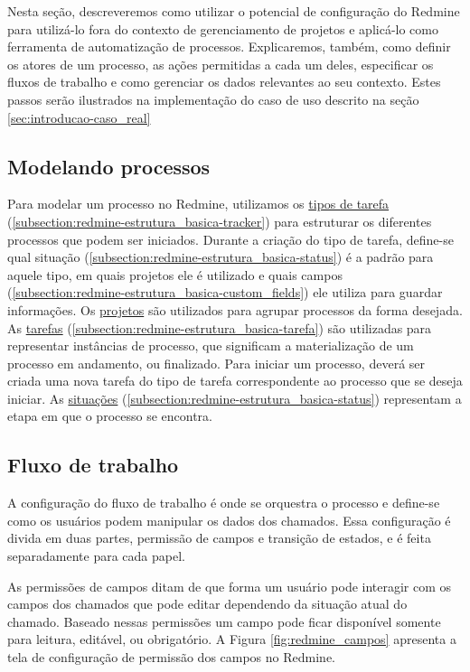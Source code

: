 Nesta seção, descreveremos como utilizar o potencial de configuração do Redmine para utilizá-lo fora do contexto de gerenciamento de projetos e aplicá-lo como ferramenta de automatização de processos. Explicaremos, também, como definir os atores de um processo, as ações permitidas a cada um deles, especificar os fluxos de trabalho e como gerenciar os dados relevantes ao seu contexto. Estes passos serão ilustrados na implementação do caso de uso descrito na seção \ref{sec:introducao-caso_real}

\subsection{Modelando processos}\label{subsection:redmine-automatizar_processo-criacao}

Para modelar um processo no Redmine, utilizamos os \underline{tipos de tarefa} (\ref{subsection:redmine-estrutura_basica-tracker}) para estruturar os diferentes processos que podem ser iniciados. Durante a criação do tipo de tarefa, define-se qual situação (\ref{subsection:redmine-estrutura_basica-status}) é a padrão para aquele tipo, em quais projetos ele é utilizado e quais campos (\ref{subsection:redmine-estrutura_basica-custom_fields}) ele utiliza para guardar informações. Os \underline{projetos} são utilizados para agrupar processos da forma desejada. As \underline{tarefas} (\ref{subsection:redmine-estrutura_basica-tarefa}) são utilizadas para representar instâncias de processo, que significam a materialização de um processo em andamento, ou finalizado. Para iniciar um processo, deverá ser criada uma nova tarefa do tipo de tarefa correspondente ao processo que se deseja iniciar. As \underline{situações} (\ref{subsection:redmine-estrutura_basica-status}) representam a etapa em que o processo se encontra. 

\subsection{Fluxo de trabalho}\label{subsection:redmine-fluxo_de_trabalho}

A configuração do fluxo de trabalho é onde se orquestra o processo e define-se como os usuários podem manipular os dados dos chamados. Essa configuração é divida em duas partes, permissão de campos e transição de estados, e é feita separadamente para cada papel.

As permissões de campos ditam de que forma um usuário pode interagir com os campos dos chamados que pode editar dependendo da situação atual do chamado. Baseado nessas permissões um campo pode ficar disponível somente para leitura, editável, ou obrigatório. A Figura \ref{fig:redmine_campos} apresenta a tela de configuração de permissão dos campos no Redmine.

